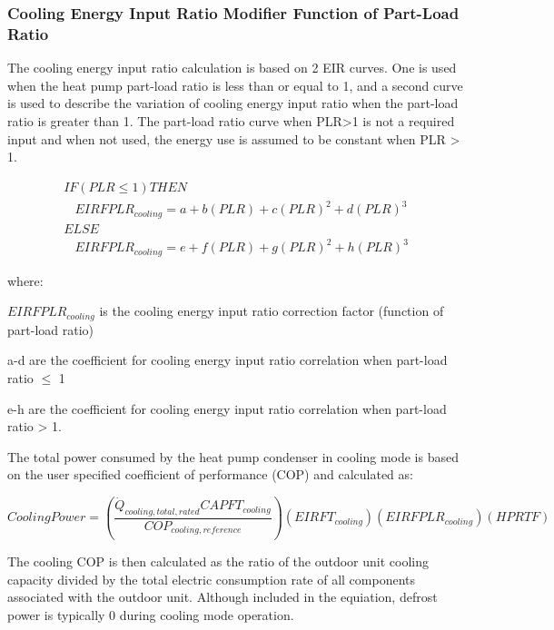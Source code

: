 \subsubsection{Cooling Energy Input Ratio Modifier Function of Part-Load Ratio}\label{cooling-energy-input-ratio-modifier-function-of-part-load-ratio}

The cooling energy input ratio calculation is based on 2 EIR curves. One is used when the heat pump part-load ratio is less than or equal to 1, and a second curve is used to describe the variation of cooling energy input ratio when the part-load ratio is greater than 1. The part-load ratio curve when PLR>1 is not a required input and when not used, the energy use is assumed to be constant when PLR > 1.

\begin{equation}
  \begin{array}{l}
  IF\left( {PLR \leq 1} \right)THEN \\
  ~~~~EIRFPLR_{cooling} = a + b \left( PLR \right) + c \left( PLR \right)^2 + d \left( PLR \right)^3 \\
  ELSE \\
  ~~~~EIRFPLR_{cooling} = e + f \left( PLR \right) + g \left( PLR \right)^2 + h \left( PLR \right)^3
  \end{array}
\end{equation}

where:

\(EIRFPLR_{cooling}\) is the cooling energy input ratio correction factor (function of part-load ratio)

a-d are the coefficient for cooling energy input ratio correlation when part-load ratio \(\leq\) 1

e-h are the coefficient for cooling energy input ratio correlation when part-load ratio > 1.

The total power consumed by the heat pump condenser in cooling mode is based on the user specified coefficient of performance (COP) and calculated as:

\begin{equation}
  CoolingPower = \left( \frac{\dot{Q}_{cooling,total,rated} CAPFT_{cooling}}{COP_{cooling,reference}} \right) \left( EIRFT_{cooling} \right) \left( EIRFPLR_{cooling} \right) \left( HPRTF \right)
\end{equation}

The cooling COP is then calculated as the ratio of the outdoor unit cooling capacity divided by the total electric consumption rate of all components associated with the outdoor unit. Although included in the equiation, defrost power is typically 0 during cooling mode operation.

